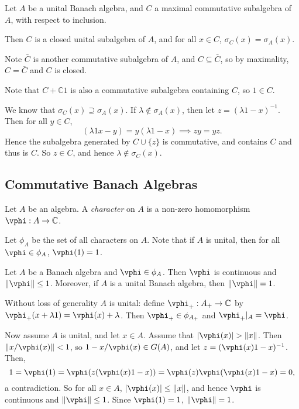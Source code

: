 \documentclass[12pt]{article}
\begin{document}
\begin{proposition}
	Let $A$ be a unital Banach algebra, and $C$ a maximal commutative subalgebra of $A$, with respect to inclusion.

	Then $C$ is a closed unital subalgebra of $A$, and for all $x \in C$, $\sigma_C(x) = \sigma_A(x)$.
\end{proposition}

\begin{proofbox}
	Note $\bar C$ is another commutative subalgebra of $A$, and $C \subseteq \bar C$, so by maximality, $C = \bar C$ and $C$ is closed.

	Note that $C + \mathbb{C} 1$ is also a commutative subalgebra containing $C$, so $1 \in C$.

	We know that $\sigma_C(x) \supseteq \sigma_A(x)$. If $\lambda \not \in \sigma_A(x)$, then let $z = (\lambda 1 - x)^{-1}$. Then for all $y \in C$, 
	\[
		(\lambda 1 x - y)  = y(\lambda 1 - x) \implies zy = yz.
	\]
	Hence the subalgebra generated by $C \cup \{z\}$ is commutative, and contains $C$ and thus is $C$. So $z \in C$, and hence $\lambda \not \in \sigma_C(x)$.
\end{proofbox}


\subsection{Commutative Banach Algebras}%
\label{sub:ceebs}


\begin{definition}
	Let $A$ be an algebra. A \emph{character} on $A$ is a non-zero homomorphism $\vphi : A \to \mathbb{C}$.

	Let $\phi_A$ be the set of all characters on $A$. Note that if $A$ is unital, then for all $\vphi \in \phi_A$, $\vphi(1) = 1$.
\end{definition}

\begin{lemma}
	Let $A$ be a Banach algebra and $\vphi \in \phi_A$. Then $\vphi$ is continuous and $\|\vphi\| \leq 1$. Moreover, if $A$ is a unital Banach algebra, then $\|\vphi\| = 1$.
\end{lemma}

\begin{proofbox}
	Without loss of generality $A$ is unital: define $\vphi_+ : A_+ \to \mathbb{C}$ by $\vphi_+(x + \lambda 1) = \vphi(x) + \lambda$. Then $\vphi_+ \in \phi_{A_+}$ and $\vphi_+|_{A} = \vphi$.

	Now assume $A$ is unital, and let $x \in A$. Assume that $|\vphi(x)| > \|x\|$. Then $\|x / \vphi(x)\| < 1$, so $1 - x/\vphi(x) \in G(A)$, and let $z = (\vphi(x) 1 - x)^{-1}$. Then,
	\[
	1 = \vphi(1) = \vphi(z(\vphi(x) 1 - x)) = \vphi(z) \vphi(\vphi(x) 1 - x) = 0,
	\]
	a contradiction. So for all $x \in A$, $|\vphi(x)| \leq \|x\|$, and hence $\vphi$ is continuous and $\|\vphi\| \leq 1$. Since $\vphi(1) = 1$, $\|\vphi\| = 1$.
\end{proofbox}
\end{document}
